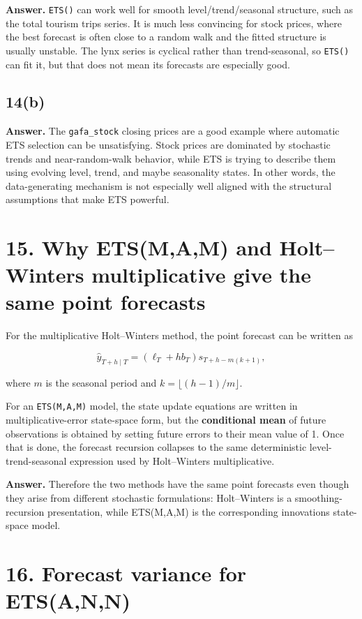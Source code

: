 \documentclass[
  11pt,
]{article}
\begin{document}
\textbf{Answer.} \texttt{ETS()} can work well for smooth
level/trend/seasonal structure, such as the total tourism trips series.
It is much less convincing for stock prices, where the best forecast is
often close to a random walk and the fitted structure is usually
unstable. The lynx series is cyclical rather than trend-seasonal, so
\texttt{ETS()} can fit it, but that does not mean its forecasts are
especially good.

\subsection{14(b)}\label{b-5}

\textbf{Answer.} The \texttt{gafa\_stock} closing prices are a good
example where automatic ETS selection can be unsatisfying. Stock prices
are dominated by stochastic trends and near-random-walk behavior, while
ETS is trying to describe them using evolving level, trend, and maybe
seasonality states. In other words, the data-generating mechanism is not
especially well aligned with the structural assumptions that make ETS
powerful.

\section{15. Why ETS(M,A,M) and Holt--Winters multiplicative give the
same point
forecasts}\label{why-etsmam-and-holtwinters-multiplicative-give-the-same-point-forecasts}

For the multiplicative Holt--Winters method, the point forecast can be
written as

\[
\hat y_{T+h\mid T} = (\ell_T + h b_T)s_{T+h-m(k+1)},
\]

where \(m\) is the seasonal period and \(k = \lfloor (h-1)/m \rfloor\).

For an \texttt{ETS(M,A,M)} model, the state update equations are written
in multiplicative-error state-space form, but the \textbf{conditional
mean} of future observations is obtained by setting future errors to
their mean value of 1. Once that is done, the forecast recursion
collapses to the same deterministic level-trend-seasonal expression used
by Holt--Winters multiplicative.

\textbf{Answer.} Therefore the two methods have the same point forecasts
even though they arise from different stochastic formulations:
Holt--Winters is a smoothing-recursion presentation, while ETS(M,A,M) is
the corresponding innovations state-space model.

\section{16. Forecast variance for
ETS(A,N,N)}\label{forecast-variance-for-etsann}
\end{document}
